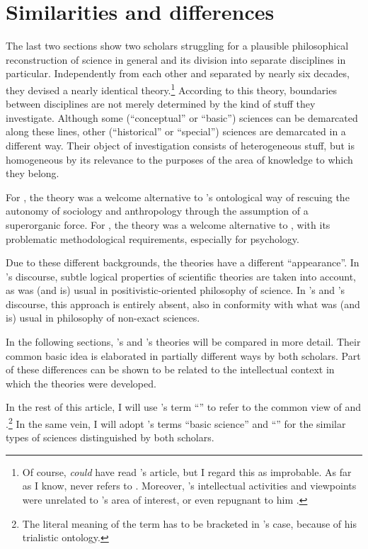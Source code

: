 \documentclass[output=paper]{langscibook}
\begin{document}
\section{Similarities and differences}
\label{sec:elffers:similaritiesdiffs}
The last two sections show two scholars struggling for a plausible philosophical reconstruction of science in general and its division into separate disciplines in particular. Independently from each other and separated by nearly six decades, they devised a nearly identical theory.\footnote{Of course, {\Fodor} \emph{could} have read {\Sapir}'s article, but I regard this as improbable. As far as I know, {\Fodor} never refers to {\Sapir}. Moreover, {\Sapir}'s intellectual activities and viewpoints were unrelated to {\Fodor}'s area of interest, or even repugnant to him \citep[cf.][]{Pullum2017}.} According to this theory, boundaries between disciplines are not merely determined by the kind of stuff they investigate. Although some (``conceptual'' or ``basic'') sciences can be demarcated along these lines, other (``historical'' or ``special'') sciences are demarcated in a different way. Their object of investigation consists of heterogeneous stuff, but is homogeneous by its relevance to the purposes of the area of knowledge to which they belong.

For {\Sapir}, the theory was a welcome alternative to {\Kroeber}'s ontological way of rescuing the autonomy of sociology and anthropology through the assumption of a superorganic force. For {\Fodor}, the theory was a welcome alternative to , with its problematic methodological requirements, especially for psychology.

Due to these different backgrounds, the theories have a different ``appearance''. In {\Fodor}'s discourse, subtle logical properties of scientific theories are taken into account, as was (and is) usual in positivistic-oriented philosophy of science. In {\Sapir}'s and {\Kroeber}'s discourse, this approach is entirely absent, also in conformity with what was (and is) usual in philosophy of non-exact sciences.

In the following sections, {\Sapir}'s and {\Fodor}'s theories will be compared in more detail. Their common basic idea is elaborated in partially different ways by both scholars. Part of these differences can be shown to be related to the intellectual context in which the theories were developed.

In the rest of this article, I will use {\Fodor}'s term ``'' to refer to the common view of {\Sapir} and {\Fodor}.\footnote{The literal meaning of the term has to be bracketed in {\Sapir}'s case, because of his trialistic ontology.} In the same vein, I will adopt {\Fodor}'s terms ``basic science'' and ``'' for the similar types of sciences distinguished by both scholars.
\end{document}
